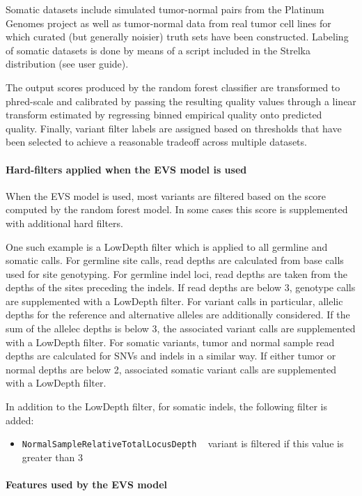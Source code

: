 \documentclass{article}
\begin{document}
Somatic datasets include simulated tumor-normal pairs from the Platinum Genomes project as well as tumor-normal data from real tumor cell lines for which curated (but generally noisier) truth sets have been constructed. Labeling of somatic datasets is done by means of a script included in the Strelka distribution (see user guide).

The output scores produced by the random forest classifier are transformed to phred-scale and calibrated by passing the resulting quality values through a linear transform estimated by regressing binned empirical quality onto predicted quality. Finally, variant filter labels are assigned based on thresholds that have been selected to achieve a reasonable tradeoff across multiple datasets.

\paragraph{Hard-filters applied when the EVS model is used}

When the EVS model is used, most variants are filtered based on the score computed by the random forest model. In some cases this score is supplemented with additional hard filters.

One such example is a LowDepth filter which is applied to all germline and somatic calls. For germline site calls, read depths are calculated from base calls used for site genotyping. For germline indel loci, read depths are taken from the depths of the sites preceding the indels. If read depths are below 3, genotype calls are supplemented with a LowDepth filter. For variant calls in particular, allelic depths for the reference and alternative alleles are additionally considered. If the sum of the allelec depths is below 3, the associated variant calls are supplemented with a LowDepth filter. For somatic variants, tumor and normal sample read depths are calculated for SNVs and indels in a similar way. If either tumor or normal depths are below 2, associated somatic variant calls are supplemented with a LowDepth filter.

In addition to the LowDepth filter, for somatic indels, the following filter is added:

\begin{itemize}
    \item \texttt{NormalSampleRelativeTotalLocusDepth} ~ variant is filtered if this value is greater than 3
\end{itemize}


\paragraph{Features used by the EVS model}
\end{document}
